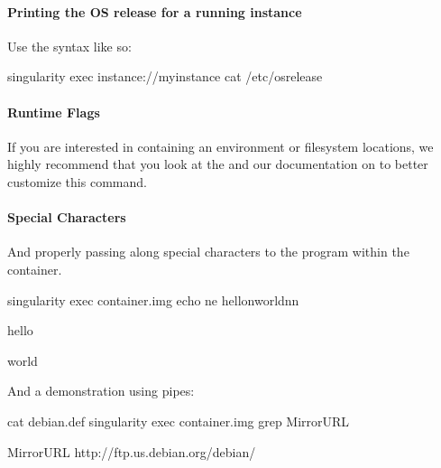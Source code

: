 \documentclass[letterpaper,10pt,english]{sphinxmanual}
\begin{document}
\paragraph{Printing the OS release for a running instance}
\label{\detokenize{appendix:printing-the-os-release-for-a-running-instance}}
Use the  syntax like so:

%
\begin{sphinxVerbatim}[commandchars=\\\{\}]
\PYGZdl{} singularity exec instance://my\PYGZhy{}instance cat /etc/os\PYGZhy{}release
\end{sphinxVerbatim}


\paragraph{Runtime Flags}
\label{\detokenize{appendix:runtime-flags}}
If you are interested in containing an environment or filesystem
locations, we highly recommend that you look at the  and our
documentation on  to better customize this command.


\paragraph{Special Characters}
\label{\detokenize{appendix:special-characters}}
And properly passing along special characters to the program within the
container.

%
\begin{sphinxVerbatim}[commandchars=\\\{\}]
\PYGZdl{} singularity exec container.img echo \PYGZhy{}ne \PYGZdq{}hello\PYGZbs{}nworld\PYGZbs{}n\PYGZbs{}n\PYGZdq{}

hello

world

\PYGZdl{}
\end{sphinxVerbatim}

And a demonstration using pipes:

%
\begin{sphinxVerbatim}[commandchars=\\\{\}]
\PYGZdl{} cat debian.def \textbar{} singularity exec container.img grep \PYGZsq{}MirrorURL\PYGZsq{}

MirrorURL \PYGZdq{}http://ftp.us.debian.org/debian/\PYGZdq{}

\PYGZdl{}
\end{sphinxVerbatim}
\end{document}
